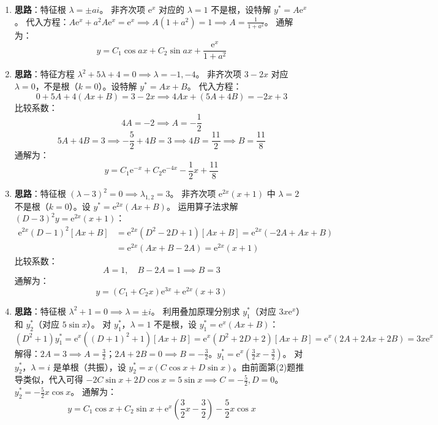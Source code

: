 \documentclass[lang=cn,11pt]{elegantbook}
\begin{document}
\begin{solution}
\begin{enumerate}
    \item[(4)] \textbf{思路}：特征根 $\lambda = \pm ai$。
    非齐次项 $\mathrm{e}^x$ 对应的 $\lambda=1$ 不是根，设特解 $y^* = A\mathrm{e}^x$。
    代入方程：$A\mathrm{e}^x + a^2 A\mathrm{e}^x = \mathrm{e}^x \implies A(1+a^2)=1 \implies A=\frac{1}{1+a^2}$。
    通解为：
    \[
    y = C_1\cos ax + C_2\sin ax + \frac{\mathrm{e}^x}{1+a^2}
    \]

    \item[(5)] \textbf{思路}：特征方程 $\lambda^2+5\lambda+4=0 \implies \lambda = -1, -4$。
    非齐次项 $3-2x$ 对应 $\lambda=0$，不是根（$k=0$）。设特解 $y^* = Ax + B$。
    代入方程：
    \[
    0 + 5A + 4(Ax+B) = 3 - 2x \implies 4Ax + (5A+4B) = -2x + 3
    \]
    比较系数：
    \[
    4A = -2 \implies A = -\frac{1}{2}
    \]
    \[
    5A + 4B = 3 \implies -\frac{5}{2} + 4B = 3 \implies 4B = \frac{11}{2} \implies B = \frac{11}{8}
    \]
    通解为：
    \[
    y = C_1\mathrm{e}^{-x} + C_2\mathrm{e}^{-4x} - \frac{1}{2}x + \frac{11}{8}
    \]

    \item[(6)] \textbf{思路}：特征根 $(\lambda-3)^2=0 \implies \lambda_{1,2}=3$。
    非齐次项 $\mathrm{e}^{2x}(x+1)$ 中 $\lambda=2$ 不是根（$k=0$）。设 $y^* = \mathrm{e}^{2x}(Ax+B)$。
    运用算子法求解 $(D-3)^2 y = \mathrm{e}^{2x}(x+1)$：
    \begin{align*}
    \mathrm{e}^{2x}(D-1)^2[Ax+B] &= \mathrm{e}^{2x}(D^2-2D+1)[Ax+B] = \mathrm{e}^{2x}(-2A + Ax + B) \\
    &= \mathrm{e}^{2x}(Ax + B - 2A) = \mathrm{e}^{2x}(x+1)
    \end{align*}
    比较系数：
    \[
    A = 1, \quad B - 2A = 1 \implies B = 3
    \]
    通解为：
    \[
    y = (C_1 + C_2 x)\mathrm{e}^{3x} + \mathrm{e}^{2x}(x+3)
    \]

    \item[(7)] \textbf{思路}：特征根 $\lambda^2+1=0 \implies \lambda=\pm i$。
    利用叠加原理分别求 $y_1^*$（对应 $3x\mathrm{e}^x$）和 $y_2^*$（对应 $5\sin x$）。
    对 $y_1^*$，$\lambda=1$ 不是根，设 $y_1^* = \mathrm{e}^x(Ax+B)$：
    \[
    (D^2+1)y_1^* = \mathrm{e}^x((D+1)^2+1)[Ax+B] = \mathrm{e}^x(D^2+2D+2)[Ax+B] = \mathrm{e}^x(2A + 2Ax + 2B) = 3x\mathrm{e}^x
    \]
    解得：$2A=3 \implies A=\frac{3}{2}$；$2A+2B=0 \implies B=-\frac{3}{2}$。$y_1^* = \mathrm{e}^x\left(\frac{3}{2}x - \frac{3}{2}\right)$。
    对 $y_2^*$，$\lambda=i$ 是单根（共振），设 $y_2^* = x(C\cos x + D\sin x)$。由前面第(2)题推导类似，代入可得 $-2C\sin x + 2D\cos x = 5\sin x \implies C=-\frac{5}{2}, D=0$。$y_2^* = -\frac{5}{2}x\cos x$。
    通解为：
    \[
    y = C_1\cos x + C_2\sin x + \mathrm{e}^x\left(\frac{3}{2}x - \frac{3}{2}\right) - \frac{5}{2}x\cos x
    \]


\end{enumerate}
\end{solution}
\end{document}
